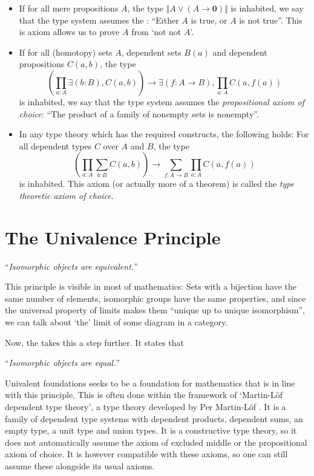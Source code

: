 \begin{itemize}
  \item If for all mere propositions $ A $, the type $ \Vert A \lor (A \to \mathbf 0) \Vert $ is inhabited, we say that the type system assumes the : ``Either $ A $ is true, or $ A $ is not true''. This is axiom allows us to prove $ A $ from `not not $ A $'.
  \item If for all (homotopy) sets $ A $, dependent sets $ B(a) $ and dependent propositions $ C(a, b) $, the type
    \[ \left(\prod_{a: A} \exists (b: B), C(a, b) \right) \to \exists (f: A \to B), \prod_{a: A} C(a, f(a)) \]
    is inhabited, we say that the type system assumes the \textit{propositional axiom of choice}: ``The product of a family of nonempty sets is nonempty''.
  \item In any type theory which has the required constructs, the following holds: For all dependent types $ C $ over $ A $ and $ B $, the type
    \[ \left(\prod_{a: A} \sum_{b: B} C(a, b) \right) \to \sum_{f: A \to B} \prod_{a: A} C(a, f(a)) \]
    is inhabited. This axiom (or actually more of a theorem) is called the \textit{type theoretic axiom of choice}.
\end{itemize}

\section{The Univalence Principle}\label{sec:univalence-principle}
\enquote{\textit{Isomorphic objects are equivalent.}}

This principle is visible in most of mathematics: Sets with a bijection have the same number of elements, isomorphic groups have the same properties, and since the universal property of limits makes them ``unique up to unique isomorphism'', we can talk about `the' limit of some diagram in a category.

Now, the  takes this a step further. It states that

\enquote{\textit{Isomorphic objects are equal.}}

Univalent foundations seeks to be a foundation for mathematics that is in line with this principle. This is often done within the framework of `Martin-Löf dependent type theory', a type theory developed by Per Martin-Löf \autocite{martin-lof-type-theory}. It is a family of dependent type systems with dependent products, dependent sums, an empty type, a unit type and union types. It is a constructive type theory, so it does not automatically assume the axiom of excluded middle or the propositional axiom of choice. It is however compatible with these axioms, so one can still assume these alongside its usual axioms.

